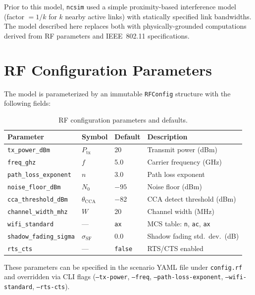 \documentclass[11pt,letterpaper]{article}
\newcommand{\ncsim}{\texttt{ncsim}}
\begin{document}
Prior to this model, \ncsim{} used a simple proximity-based interference model
(factor $= 1/k$ for $k$ nearby active links) with statically specified link
bandwidths.  The model described here replaces both with physically-grounded
computations derived from RF parameters and IEEE~802.11 specifications.

\section{RF Configuration Parameters}
\label{sec:rfconfig}

The model is parameterized by an immutable \texttt{RFConfig} structure with the
following fields:

\begin{table}[h]
\centering
\caption{RF configuration parameters and defaults.}
\label{tab:rfconfig}
\begin{tabular}{@{}llll@{}}
\toprule
\textbf{Parameter} & \textbf{Symbol} & \textbf{Default} & \textbf{Description} \\
\midrule
\texttt{tx\_power\_dBm} & $P_\text{tx}$ & 20 & Transmit power (dBm) \\
\texttt{freq\_ghz} & $f$ & 5.0 & Carrier frequency (GHz) \\
\texttt{path\_loss\_exponent} & $n$ & 3.0 & Path loss exponent \\
\texttt{noise\_floor\_dBm} & $N_0$ & $-95$ & Noise floor (dBm) \\
\texttt{cca\_threshold\_dBm} & $\theta_\text{CCA}$ & $-82$ & CCA detect threshold (dBm) \\
\texttt{channel\_width\_mhz} & $W$ & 20 & Channel width (MHz) \\
\texttt{wifi\_standard} & --- & \texttt{ax} & MCS table: \texttt{n}, \texttt{ac}, \texttt{ax} \\
\texttt{shadow\_fading\_sigma} & $\sigma_\text{SF}$ & 0.0 & Shadow fading std.\ dev.\ (dB) \\
\texttt{rts\_cts} & --- & \texttt{false} & RTS/CTS enabled \\
\bottomrule
\end{tabular}
\end{table}

These parameters can be specified in the scenario YAML file under
\texttt{config.rf} and overridden via CLI flags (\texttt{--tx-power},
\texttt{--freq}, \texttt{--path-loss-exponent}, \texttt{--wifi-standard},
\texttt{--rts-cts}).
\end{document}
